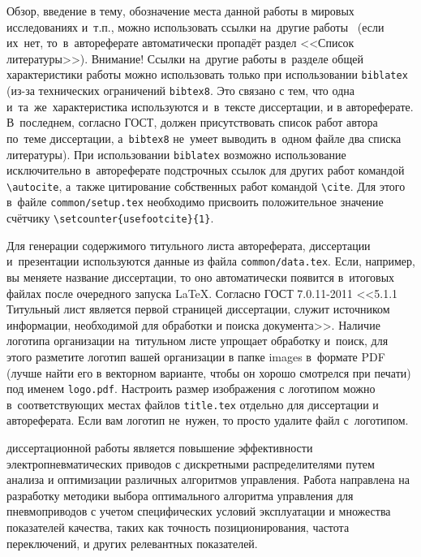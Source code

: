 
{\actuality} Обзор, введение в тему, обозначение места данной работы в
мировых исследованиях и~т.\:п., можно использовать ссылки на~другие
работы~\autocite{Gosele1999161,Lermontov}
(если их~нет, то~в~автореферате
автоматически пропадёт раздел <<Список литературы>>). Внимание! Ссылки
на~другие работы в~разделе общей характеристики работы можно
использовать только при использовании \verb!biblatex! (из-за технических
ограничений \verb!bibtex8!. Это связано с тем, что одна
и~та~же~характеристика используются и~в~тексте диссертации, и в
автореферате. В~последнем, согласно ГОСТ, должен присутствовать список
работ автора по~теме диссертации, а~\verb!bibtex8! не~умеет выводить в~одном
файле два списка литературы).
При использовании \verb!biblatex! возможно использование исключительно
в~автореферате подстрочных ссылок
для других работ командой \verb!\autocite!, а~также цитирование
собственных работ командой \verb!\cite!. Для этого в~файле
\verb!common/setup.tex! необходимо присвоить положительное значение
счётчику \verb!\setcounter{usefootcite}{1}!.

Для генерации содержимого титульного листа автореферата, диссертации
и~презентации используются данные из файла \verb!common/data.tex!. Если,
например, вы меняете название диссертации, то оно автоматически
появится в~итоговых файлах после очередного запуска \LaTeX. Согласно
ГОСТ 7.0.11-2011 <<5.1.1 Титульный лист является первой страницей
диссертации, служит источником информации, необходимой для обработки и
поиска документа>>. Наличие логотипа организации на~титульном листе
упрощает обработку и~поиск, для этого разметите логотип вашей
организации в папке images в~формате PDF (лучше найти его в векторном
варианте, чтобы он хорошо смотрелся при печати) под именем
\verb!logo.pdf!. Настроить размер изображения с логотипом можно
в~соответствующих местах файлов \verb!title.tex!  отдельно для
диссертации и автореферата. Если вам логотип не~нужен, то просто
удалите файл с~логотипом.

\ifsynopsis

\else

\fi


{\aim}  диссертационной работы является повышение эффективности электропневматических приводов с
дискретными распределителями путем анализа и оптимизации различных алгоритмов управления.
Работа направлена на разработку методики выбора оптимального алгоритма управления для пневмоприводов
с учетом специфических условий эксплуатации и множества показателей качества, таких как точность позиционирования,
частота переключений, и других релевантных показателей.

